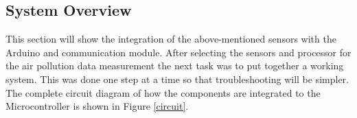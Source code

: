  

 \subsection{System Overview}

 This section will show the integration of the above-mentioned sensors with the Arduino and communication module. After selecting the sensors and processor for the air pollution data measurement the next task was to put together a working system. This was done one step at a time so that troubleshooting will be simpler. The complete circuit diagram of how the components are integrated to the Microcontroller is shown in Figure \ref{circuit}.
 
